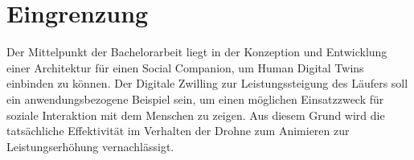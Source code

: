 \section{Eingrenzung}
Der Mittelpunkt der Bachelorarbeit liegt in der Konzeption und Entwicklung einer Architektur für einen Social Companion, um Human Digital Twins einbinden zu können. Der Digitale Zwilling zur Leistungssteigung des Läufers soll ein anwendungsbezogene Beispiel sein, um einen möglichen Einsatzzweck für soziale Interaktion mit dem Menschen zu zeigen. Aus diesem Grund wird die tatsächliche Effektivität im Verhalten der Drohne zum Animieren zur Leistungserhöhung vernachlässigt.

